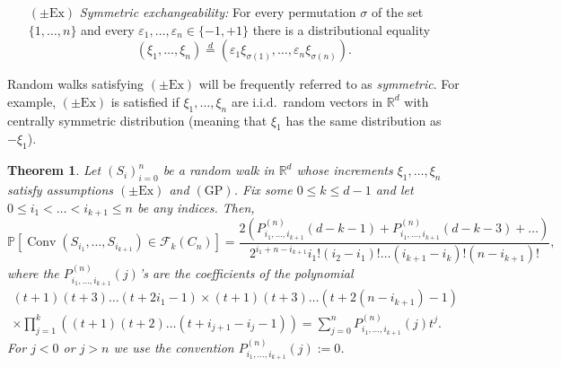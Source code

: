\documentclass[12pt, reqno]{amsart}
\theoremstyle{plain}
\newtheorem{theorem}{Theorem}[section]
\theoremstyle{definition}
\theoremstyle{remark}
\begin{document}
\begin{itemize}
\item [$(\pm\text{Ex})$] \textit{Symmetric exchangeability:} For every permutation $\sigma$ of the set $\{1,\ldots,n\}$ and every ${\varepsilon}_1,\ldots,{\varepsilon}_n\in \{-1,+1\}$ there is a distributional equality
    $$
    (\xi_1,\ldots,\xi_n) {\stackrel{d}{=}} ({\varepsilon}_1 \xi_{\sigma(1)}, \ldots, {\varepsilon}_n \xi_{\sigma(n)}).
    $$
\end{itemize}
Random walks satisfying $(\pm\text{Ex})$ will be frequently referred to as \emph{symmetric}. For example, $(\pm\text{Ex})$ is satisfied if $\xi_1,\ldots,\xi_n$ are i.i.d.\ random vectors in ${\mathbb{R}}^d$ with centrally symmetric distribution (meaning that $\xi_1$ has the same distribution as $-\xi_1$).
\begin{theorem}\label{1249}
Let $(S_i)_{i=0}^n$ be a random walk in ${\mathbb{R}}^d$ whose increments $\xi_1,\ldots,\xi_n$ satisfy assumptions $(\pm\text{Ex})$ and $(\text{GP})$.
Fix some $0\leq k\leq d-1$ and let $0 \le i_1 < \ldots < i_{k+1} \le n$ be any indices. Then,
$$
{\mathbb{P}}[{\mathop{\mathrm{Conv}}\nolimits}(S_{i_1},\ldots,S_{i_{k+1}}) \in \mathcal F_k(C_n)]
=
\frac{2(P_{i_1,\ldots,i_{k+1}}^{(n)}(d-k-1) + P_{i_1,\ldots,i_{k+1}}^{(n)}(d-k-3)+\ldots)}
{2^{i_1+n-i_{k+1}} i_1!(i_2-i_1)!\ldots  (i_{k+1}-i_k)! (n-i_{k+1})!} ,
$$
where the $P_{i_1,\ldots,i_{k+1}}^{(n)}(j)$'s  are the coefficients of the polynomial
\begin{multline*}
(t+1)(t+3)\ldots (t+2i_1-1)\times(t+1)(t+3)\ldots (t+2(n-i_{k+1})-1)\\
\times\prod_{j=1}^k ((t+1)(t+2)\ldots (t+i_{j+1}-i_j-1)) = \sum_{j=0}^n P_{i_1,\ldots,i_{k+1}}^{(n)}(j) t^j.
\end{multline*}
For $j<0$ or $j>n$ we use the convention $P_{i_1,\ldots,i_{k+1}}^{(n)}(j) := 0$.
\end{theorem}
\end{document}

